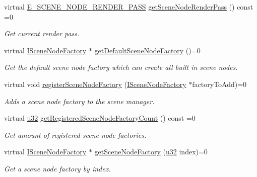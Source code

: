 \begin{DoxyCompactItemize}
virtual \hyperlink{namespaceirr_1_1scene_a7862269bd1abc123929d4dbb8200d67f}{E\+\_\+\+S\+C\+E\+N\+E\+\_\+\+N\+O\+D\+E\+\_\+\+R\+E\+N\+D\+E\+R\+\_\+\+P\+A\+SS} \hyperlink{classirr_1_1scene_1_1ISceneManager_a2b8f844a1367d80648bc055a5639807b}{get\+Scene\+Node\+Render\+Pass} () const =0
\begin{DoxyCompactList}\small\item\em Get current render pass. \end{DoxyCompactList}\item 
virtual \hyperlink{classirr_1_1scene_1_1ISceneNodeFactory}{I\+Scene\+Node\+Factory} $\ast$ \hyperlink{classirr_1_1scene_1_1ISceneManager_a1ea0ec7ec95a97819f1de5222b97e774}{get\+Default\+Scene\+Node\+Factory} ()=0
\begin{DoxyCompactList}\small\item\em Get the default scene node factory which can create all built in scene nodes. \end{DoxyCompactList}\item 
virtual void \hyperlink{classirr_1_1scene_1_1ISceneManager_a75ac9315def74ae5e26a2d6a2f5a38e9}{register\+Scene\+Node\+Factory} (\hyperlink{classirr_1_1scene_1_1ISceneNodeFactory}{I\+Scene\+Node\+Factory} $\ast$factory\+To\+Add)=0
\begin{DoxyCompactList}\small\item\em Adds a scene node factory to the scene manager. \end{DoxyCompactList}\item 
\mbox{\label{classirr_1_1scene_1_1ISceneManager_a405dd898657d08cd1dbf973d1cb88b19}} 
virtual \hyperlink{namespaceirr_a0416a53257075833e7002efd0a18e804}{u32} \hyperlink{classirr_1_1scene_1_1ISceneManager_a405dd898657d08cd1dbf973d1cb88b19}{get\+Registered\+Scene\+Node\+Factory\+Count} () const =0
\begin{DoxyCompactList}\small\item\em Get amount of registered scene node factories. \end{DoxyCompactList}\item 
virtual \hyperlink{classirr_1_1scene_1_1ISceneNodeFactory}{I\+Scene\+Node\+Factory} $\ast$ \hyperlink{classirr_1_1scene_1_1ISceneManager_ac912b9effd5ce46f5dc038e0568e614c}{get\+Scene\+Node\+Factory} (\hyperlink{namespaceirr_a0416a53257075833e7002efd0a18e804}{u32} index)=0
\begin{DoxyCompactList}\small\item\em Get a scene node factory by index. \end{DoxyCompactList}\item 

\end{DoxyCompactItemize}

